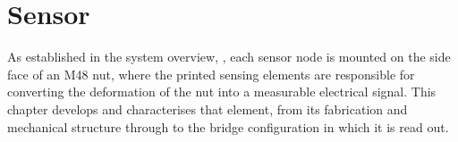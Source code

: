 \chapter{Sensor} \label{sec:Sensor}

%

As established in the system overview, , each sensor node is mounted on the side face of an M48 nut, where the printed sensing elements are responsible for converting the deformation of the nut into a measurable electrical signal. This chapter develops and characterises that element, from its fabrication and mechanical structure through to the bridge configuration in which it is read out.

